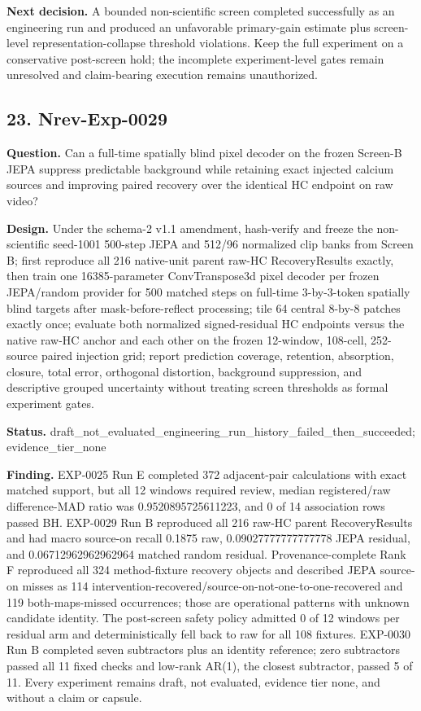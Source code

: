 \textbf{Next decision.} A bounded non-scientific screen completed successfully as an engineering run and produced an unfavorable primary-gain estimate plus screen-level representation-collapse threshold violations. Keep the full experiment on a conservative post-screen hold; the incomplete experiment-level gates remain unresolved and claim-bearing execution remains unauthorized.

\subsection{23. Nrev-Exp-0029}

\textbf{Question.} Can a full-time spatially blind pixel decoder on the frozen Screen-B JEPA suppress predictable background while retaining exact injected calcium sources and improving paired recovery over the identical HC endpoint on raw video?

\textbf{Design.} Under the schema-2 v1.1 amendment, hash-verify and freeze the non-scientific seed-1001 500-step JEPA and 512/96 normalized clip banks from Screen B; first reproduce all 216 native-unit parent raw-HC RecoveryResults exactly, then train one 16385-parameter ConvTranspose3d pixel decoder per frozen JEPA/random provider for 500 matched steps on full-time 3-by-3-token spatially blind targets after mask-before-reflect processing; tile 64 central 8-by-8 patches exactly once; evaluate both normalized signed-residual HC endpoints versus the native raw-HC anchor and each other on the frozen 12-window, 108-cell, 252-source paired injection grid; report prediction coverage, retention, absorption, closure, total error, orthogonal distortion, background suppression, and descriptive grouped uncertainty without treating screen thresholds as formal experiment gates.

\textbf{Status.} draft\_not\_evaluated\_engineering\_run\_history\_failed\_then\_succeeded; evidence\_tier\_none

\textbf{Finding.} EXP-0025 Run E completed 372 adjacent-pair calculations with exact matched support, but all 12 windows required review, median registered/raw difference-MAD ratio was 0.9520895725611223, and 0 of 14 association rows passed BH. EXP-0029 Run B reproduced all 216 raw-HC parent RecoveryResults and had macro source-on recall 0.1875 raw, 0.09027777777777778 JEPA residual, and 0.06712962962962964 matched random residual. Provenance-complete Rank F reproduced all 324 method-fixture recovery objects and described JEPA source-on misses as 114 intervention-recovered/source-on-not-one-to-one-recovered and 119 both-maps-missed occurrences; those are operational patterns with unknown candidate identity. The post-screen safety policy admitted 0 of 12 windows per residual arm and deterministically fell back to raw for all 108 fixtures. EXP-0030 Run B completed seven subtractors plus an identity reference; zero subtractors passed all 11 fixed checks and low-rank AR(1), the closest subtractor, passed 5 of 11. Every experiment remains draft, not evaluated, evidence tier none, and without a claim or capsule.

